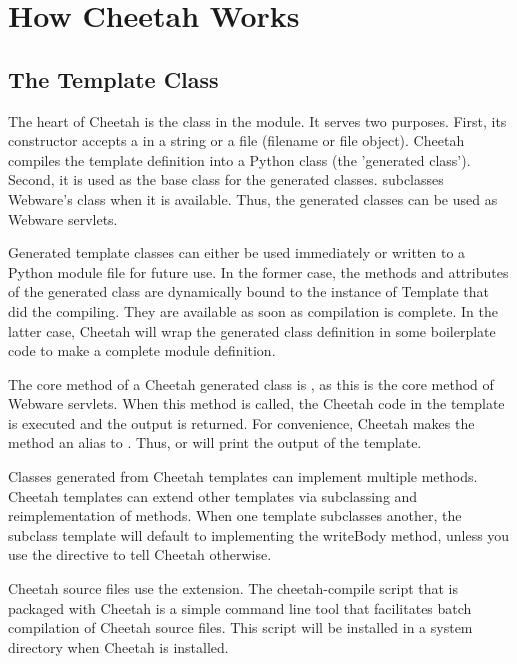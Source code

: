 \section{How Cheetah Works}
\label{howWorks}

\subsection{The Template Class}
\label{howWorks.templateClass}

The heart of Cheetah is the  class in the 
module. It serves two purposes. First, its constructor accepts a
 in a string or a file (filename or file object).
Cheetah compiles the template definition into a Python class (the 'generated
class'). Second, it is used as the base class for the generated classes.
 subclasses Webware's  class when it is
available. Thus, the generated classes can be used as Webware servlets.

Generated template classes can either be used immediately or written to a Python
module file for future use. In the former case, the methods and attributes of
the generated class are dynamically bound to the instance of Template that did
the compiling. They are available as soon as compilation is complete. In the
latter case, Cheetah will wrap the generated class definition in some
boilerplate code to make a complete module definition.

The core method of a Cheetah generated class is , as this is the
core method of Webware servlets. When this method is called, the Cheetah code in
the template is executed and the output is returned. For convenience, Cheetah
makes the  method an alias to . Thus,
 or  will
print the output of the template.

Classes generated from Cheetah templates can implement multiple methods. Cheetah
templates can extend other templates via subclassing and reimplementation of
methods. When one template subclasses another, the subclass template will
default to implementing the writeBody method, unless you use the
 directive to tell Cheetah otherwise.

Cheetah source files use the  extension. The cheetah-compile script
that is packaged with Cheetah is a simple command line tool that facilitates
batch compilation of Cheetah source files. This script will be installed in a
system directory when Cheetah is installed.

